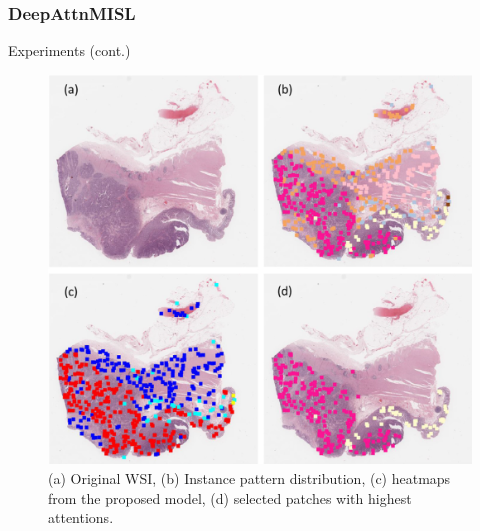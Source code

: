 \documentclass{beamer}
\begin{document}
	\begin{frame}
		\frametitle{DeepAttnMISL}
		Experiments (cont.)
		
		\begin{figure}[H]
			\centering
			\includegraphics[scale=0.15]{figures/heat1.png}
			\caption{(a) Original WSI, (b) Instance pattern distribution, (c) heatmaps from the proposed model, (d) selected patches with highest attentions.}
			\label{fig:heat1}
		\end{figure}
	\end{frame}
	
\end{document}
